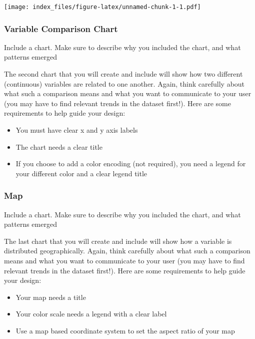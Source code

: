 \documentclass[
]{article}
\providecommand{\tightlist}{%
  \setlength{\itemsep}{0pt}\setlength{\parskip}{0pt}}
\begin{document}
\texttt{[image: index\_files/figure-latex/unnamed-chunk-1-1.pdf]}

\subsubsection{Variable Comparison
Chart}\label{variable-comparison-chart}

Include a chart. Make sure to describe why you included the chart, and
what patterns emerged

The second chart that you will create and include will show how two
different (continuous) variables are related to one another. Again,
think carefully about what such a comparison means and what you want to
communicate to your user (you may have to find relevant trends in the
dataset first!). Here are some requirements to help guide your design:

\begin{itemize}
\tightlist
\item
  You must have clear x and y axis labels
\item
  The chart needs a clear title~
\item
  If you choose to add a color encoding (not required), you need a
  legend for your different color and a clear legend title
\end{itemize}

\subsubsection{Map}\label{map}

Include a chart. Make sure to describe why you included the chart, and
what patterns emerged

The last chart that you will create and include will show how a variable
is distributed geographically. Again, think carefully about what such a
comparison means and what you want to communicate to your user (you may
have to find relevant trends in the dataset first!). Here are some
requirements to help guide your design:

\begin{itemize}
\tightlist
\item
  Your map needs a title
\item
  Your color scale needs a legend with a clear label
\item
  Use a map based coordinate system to set the aspect ratio of your map
\end{itemize}
\end{document}
